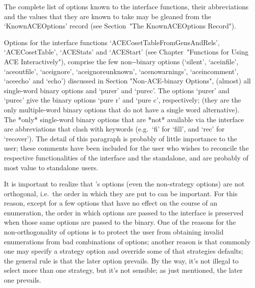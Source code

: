 The complete list of {\ACE} options  known  to  the  {\ACE}  interface
functions, their abbreviations and the values that they are  known  to
take  may  be  gleaned  from   the   `KnownACEOptions'   record   (see
Section~"The KnownACEOptions Record").

Options      for      the       {\ACE}       interface       functions
`ACECosetTableFromGensAndRels',   `ACECosetTable',   `ACEStats'    and
`ACEStart' (see  Chapter~"Functions  for  Using  ACE  Interactively"),
comprise the few  non-{\ACE}-binary  options  (`silent',  `aceinfile',
`aceoutfile',   `aceignore',   `aceignoreunknown',    `acenowarnings',
`aceincomment',     `aceecho'     and     `echo')     discussed     in
Section "Non-ACE-binary  Options",  (almost)  all  single-word  {\ACE}
binary options and  `purer'  and  `purec'.  The  options  `purer'  and
`purec' give  the  {\ACE}  binary  options  `pure  r'  and  `pure  c',
respectively; (they are the only multiple-word {\ACE}  binary  options
that do not have a single word alternative).  The  *only*  single-word
{\ACE}  binary  options  that  are  *not*  available  via  the  {\ACE}
interface are abbreviations that clash with {\GAP} keywords (e.g.~`fi'
for `fill', and `rec' for `recover'). The detail of this paragraph  is
probably of little importance to the {\GAP} user; these comments  have
been included for the user who  wishes  to  reconcile  the  respective
functionalities of the {\ACE} interface and the {\ACE} standalone, and
are probably of most value to standalone users.


It  is  important  to  realize  that  {\ACE}'s   options   (even   the
non-strategy options) are not orthogonal, i.e.\  the  order  in  which
they are put to {\ACE} can be important. For this reason, except for a
few options that have no effect on the course of an  enumeration,  the
order in which options are passed to the {\ACE} interface is preserved
when those same options are passed to the {\ACE} binary.  One  of  the
reasons for the non-orthogonality of options is to  protect  the  user
from obtaining invalid enumerations from bad combinations of  options;
another reason is that commonly one may specify a strategy option  and
override some of that strategies defaults; the general  rule  is  that
the later option prevails. By the way, it's not illegal to select more
than one strategy, but it's not sensible; as just mentioned, the later
one prevails.

